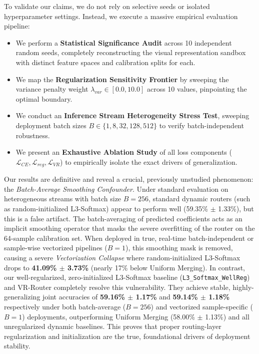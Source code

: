 To validate our claims, we do not rely on selective seeds or isolated hyperparameter settings. Instead, we execute a massive empirical evaluation pipeline:
\begin{itemize}
    \item We perform a \textbf{Statistical Significance Audit} across 10 independent random seeds, completely reconstructing the visual representation sandbox with distinct feature spaces and calibration splits for each.
    \item We map the \textbf{Regularization Sensitivity Frontier} by sweeping the variance penalty weight $\lambda_{var} \in [0.0, 10.0]$ across 10 values, pinpointing the optimal boundary.
    \item We conduct an \textbf{Inference Stream Heterogeneity Stress Test}, sweeping deployment batch sizes $B \in \{1, 8, 32, 128, 512\}$ to verify batch-independent robustness.
    \item We present an \textbf{Exhaustive Ablation Study} of all loss components ($\mathcal{L}_{CE}, \mathcal{L}_{reg}, \mathcal{L}_{VR}$) to empirically isolate the exact drivers of generalization.
\end{itemize}

Our results are definitive and reveal a crucial, previously unstudied phenomenon: the \emph{Batch-Average Smoothing Confounder}. Under standard evaluation on heterogeneous streams with batch size $B=256$, standard dynamic routers (such as random-initialized L3-Softmax) appear to perform well (59.35\% $\pm$ 1.33\%), but this is a false artifact. The batch-averaging of predicted coefficients acts as an implicit smoothing operator that masks the severe overfitting of the router on the 64-sample calibration set. When deployed in true, real-time batch-independent or sample-wise vectorized pipelines ($B=1$), this smoothing mask is removed, causing a severe \emph{Vectorization Collapse} where random-initialized L3-Softmax drops to \textbf{41.09\% $\pm$ 3.73\%} (nearly 17\% below Uniform Merging). In contrast, our well-regularized, zero-initialized L3-Softmax baseline (\texttt{L3\_Softmax\_WellReg}) and VR-Router completely resolve this vulnerability. They achieve stable, highly-generalizing joint accuracies of \textbf{59.16\% $\pm$ 1.17\%} and \textbf{59.14\% $\pm$ 1.18\%} respectively under both batch-average ($B=256$) and vectorized sample-specific ($B=1$) deployments, outperforming Uniform Merging (58.00\% $\pm$ 1.13\%) and all unregularized dynamic baselines. This proves that proper routing-layer regularization and initialization are the true, foundational drivers of deployment stability.
